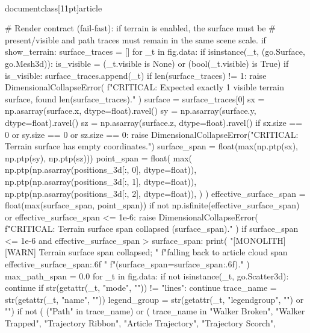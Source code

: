 \\documentclass[11pt]{article}
\begin{document}
\begin{CodeBlock}
{{{{{{    # Render contract (fail-fast): if terrain is enabled, the surface must be
    # present/visible and path traces must remain in the same scene scale.
    if show_terrain:
        surface_traces = []
        for _t in fig.data:
            if isinstance(_t, (go.Surface, go.Mesh3d)):
                is_visible = (_t.visible is None) or (bool(_t.visible) is True)
                if is_visible:
                    surface_traces.append(_t)
        if len(surface_traces) != 1:
            raise DimensionalCollapseError(
                f"CRITICAL: Expected exactly 1 visible terrain surface, found {len(surface_traces)}."
            )
        surface = surface_traces[0]
        sx = np.asarray(surface.x, dtype=float).ravel()
        sy = np.asarray(surface.y, dtype=float).ravel()
        sz = np.asarray(surface.z, dtype=float).ravel()
        if sx.size == 0 or sy.size == 0 or sz.size == 0:
            raise DimensionalCollapseError("CRITICAL: Terrain surface has empty coordinates.")
        surface_span = float(max(np.ptp(sx), np.ptp(sy), np.ptp(sz)))
        point_span = float(
            max(
                np.ptp(np.asarray(positions_3d[:, 0], dtype=float)),
                np.ptp(np.asarray(positions_3d[:, 1], dtype=float)),
                np.ptp(np.asarray(positions_3d[:, 2], dtype=float)),
            )
        )
        effective_surface_span = float(max(surface_span, point_span))
        if not np.isfinite(effective_surface_span) or effective_surface_span <= 1e-6:
            raise DimensionalCollapseError(
                f"CRITICAL: Terrain surface span collapsed ({surface_span})."
            )
        if surface_span <= 1e-6 and effective_surface_span > surface_span:
            print(
                "[MONOLITH][WARN] Terrain surface span collapsed; "
                f"falling back to article cloud span {effective_surface_span:.6f} "
                f"(surface_span={surface_span:.6f})."
            )
        max_path_span = 0.0
        for _t in fig.data:
            if not isinstance(_t, go.Scatter3d):
                continue
            if str(getattr(_t, "mode", "")) != "lines":
                continue
            trace_name = str(getattr(_t, "name", ""))
            legend_group = str(getattr(_t, "legendgroup", "") or "")
            if not (
                ("Path" in trace_name)
                or (
                    trace_name in {
                        "Walker Broken",
                        "Walker Trapped",
                        "Trajectory Ribbon",
                        "Article Trajectory",
                        "Trajectory Scorch",
}}}}}}}
\end{CodeBlock}
\end{document}
